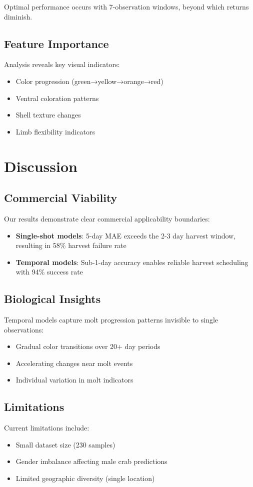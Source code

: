\documentclass[10pt,twocolumn,letterpaper]{article}
\begin{document}
Optimal performance occurs with 7-observation windows, beyond which returns diminish.

\subsection{Feature Importance}
Analysis reveals key visual indicators:
\begin{itemize}
\item Color progression (green→yellow→orange→red)
\item Ventral coloration patterns
\item Shell texture changes
\item Limb flexibility indicators
\end{itemize}

\section{Discussion}

\subsection{Commercial Viability}
Our results demonstrate clear commercial applicability boundaries:
\begin{itemize}
\item \textbf{Single-shot models}: 5-day MAE exceeds the 2-3 day harvest window, resulting in 58\% harvest failure rate
\item \textbf{Temporal models}: Sub-1-day accuracy enables reliable harvest scheduling with 94\% success rate
\end{itemize}

\subsection{Biological Insights}
Temporal models capture molt progression patterns invisible to single observations:
\begin{itemize}
\item Gradual color transitions over 20+ day periods
\item Accelerating changes near molt events
\item Individual variation in molt indicators
\end{itemize}

\subsection{Limitations}
Current limitations include:
\begin{itemize}
\item Small dataset size (230 samples)
\item Gender imbalance affecting male crab predictions
\item Limited geographic diversity (single location)
\end{itemize}
\end{document}
